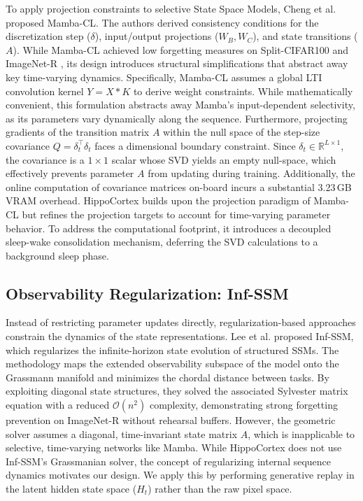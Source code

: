 To apply projection constraints to selective State Space Models, Cheng et al. \cite{chengMambaCLOptimizingSelective2025} proposed Mamba-CL. The authors derived consistency conditions for the discretization step ($\delta$), input/output projections ($W_B, W_C$), and state transitions ($A$). While Mamba-CL achieved low forgetting measures on Split-CIFAR100 and ImageNet-R \cite{hendrycksManyFacesRobustness2021}, its design introduces structural simplifications that abstract away key time-varying dynamics. Specifically, Mamba-CL assumes a global LTI convolution kernel $Y = X * K$ to derive weight constraints. While mathematically convenient, this formulation abstracts away Mamba's input-dependent selectivity, as its parameters vary dynamically along the sequence. Furthermore, projecting gradients of the transition matrix $A$ within the null space of the step-size covariance $Q = \delta_t^\top \delta_t$ faces a dimensional boundary constraint. Since $\delta_t \in \mathbb{R}^{L \times 1}$, the covariance is a $1 \times 1$ scalar whose SVD yields an empty null-space, which effectively prevents parameter $A$ from updating during training. Additionally, the online computation of covariance matrices on-board incurs a substantial 3.23\,GB VRAM overhead. HippoCortex builds upon the projection paradigm of Mamba-CL but refines the projection targets to account for time-varying parameter behavior. To address the computational footprint, it introduces a decoupled sleep-wake consolidation mechanism, deferring the SVD calculations to a background sleep phase.

\subsection{Observability Regularization: Inf-SSM}

Instead of restricting parameter updates directly, regularization-based approaches constrain the dynamics of the state representations. Lee et al. \cite{leeExemplarFreeContinualLearning2026} proposed Inf-SSM, which regularizes the infinite-horizon state evolution of structured SSMs. The methodology maps the extended observability subspace of the model onto the Grassmann manifold and minimizes the chordal distance between tasks. By exploiting diagonal state structures, they solved the associated Sylvester matrix equation with a reduced $\mathcal{O}(n^2)$ complexity, demonstrating strong forgetting prevention on ImageNet-R without rehearsal buffers. However, the geometric solver assumes a diagonal, time-invariant state matrix $A$, which is inapplicable to selective, time-varying networks like Mamba. While HippoCortex does not use Inf-SSM's Grassmanian solver, the concept of regularizing internal sequence dynamics motivates our design. We apply this by performing generative replay in the latent hidden state space ($H_t$) rather than the raw pixel space.


